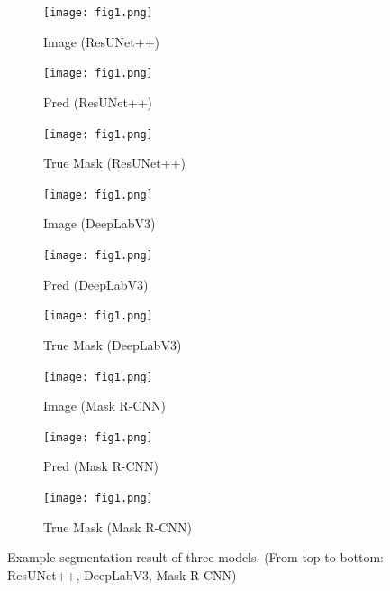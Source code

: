 \documentclass[conference]{IEEEtran}
\begin{document}
\begin{figure}[!t]
    \centering
    \begin{subfigure}[t]{0.15\textwidth}
        \centering
        \texttt{[image: fig1.png]}
        \caption{Image (ResUNet++)}
    \end{subfigure}
    \hfill
    \begin{subfigure}[t]{0.15\textwidth}
        \centering
        \texttt{[image: fig1.png]}
        \caption{Pred (ResUNet++)}
    \end{subfigure}
    \hfill
    \begin{subfigure}[t]{0.15\textwidth}
        \centering
        \texttt{[image: fig1.png]}
        \caption{True Mask (ResUNet++)}
    \end{subfigure}

    \vspace{0.5em}
    \begin{subfigure}[t]{0.15\textwidth}
        \centering
        \texttt{[image: fig1.png]}
        \caption{Image (DeepLabV3)}
    \end{subfigure}
    \hfill
    \begin{subfigure}[t]{0.15\textwidth}
        \centering
        \texttt{[image: fig1.png]}
        \caption{Pred (DeepLabV3)}
    \end{subfigure}
    \hfill
    \begin{subfigure}[t]{0.15\textwidth}
        \centering
        \texttt{[image: fig1.png]}
        \caption{True Mask (DeepLabV3)}
    \end{subfigure}

    \vspace{0.5em}
    \begin{subfigure}[t]{0.15\textwidth}
        \centering
        \texttt{[image: fig1.png]}
        \caption{Image (Mask R-CNN)}
    \end{subfigure}
    \hfill
    \begin{subfigure}[t]{0.15\textwidth}
        \centering
        \texttt{[image: fig1.png]}
        \caption{Pred (Mask R-CNN)}
    \end{subfigure}
    \hfill
    \begin{subfigure}[t]{0.15\textwidth}
        \centering
        \texttt{[image: fig1.png]}
        \caption{True Mask (Mask R-CNN)}
    \end{subfigure}

    \caption{Example segmentation result of three models. (From top to bottom: ResUNet++, DeepLabV3, Mask R-CNN)}
\end{figure}
\end{document}

